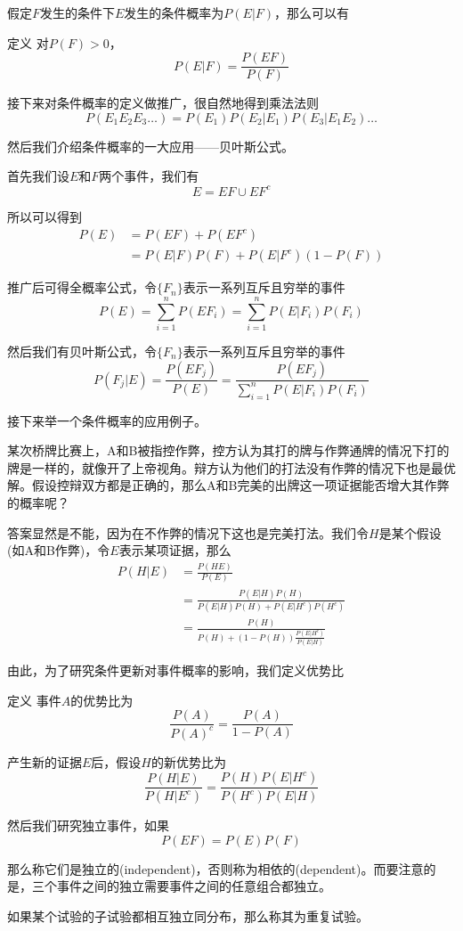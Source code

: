 \documentclass[UTF8]{ctexart}
\begin{document}
假定$F$发生的条件下$E$发生的条件概率为$P(E|F)$，那么可以有

定义 对$P(F)>0$，$$P(E|F)=\frac{P(EF)}{P(F)}$$

接下来对条件概率的定义做推广，很自然地得到乘法法则
$$P(E_{1}E_{2}E_{3}\ldots )=P(E_{1})P(E_{2}|E_{1})P(E_{3}|E_{1}E_{2})\ldots $$

然后我们介绍条件概率的一大应用——贝叶斯公式。

首先我们设$E$和$F$两个事件，我们有
$$E=EF\cup EF^{c}$$

所以可以得到
$$\begin{aligned}
P(E)&=P(EF)+P(EF^{c})\\
&=P(E|F)P(F)+P(E|F^{c})(1-P(F))
\end{aligned}$$

推广后可得全概率公式，令$\{F_{n}\}$表示一系列互斥且穷举的事件
$$P(E)=\sum_{i=1}^{n}P(EF_{i})=\sum_{i=1}^{n}P(E|F_{i})P(F_{i}) $$

然后我们有贝叶斯公式，令$\{F_{n}\}$表示一系列互斥且穷举的事件
$$P(F_{j}|E)=\frac{P(EF_{j})}{P(E)}=\frac{P(EF_{j})}{\sum\limits_{i=1}^{n}P(E|F_{i})P(F_{i})}$$

接下来举一个条件概率的应用例子。

某次桥牌比赛上，A和B被指控作弊，控方认为其打的牌与作弊通牌的情况下打的牌是一样的，就像开了上帝视角。辩方认为他们的打法没有作弊的情况下也是最优解。假设控辩双方都是正确的，那么A和B完美的出牌这一项证据能否增大其作弊的概率呢？

答案显然是不能，因为在不作弊的情况下这也是完美打法。我们令$H$是某个假设(如A和B作弊)，令$E$表示某项证据，那么
$$\begin{aligned}
P(H|E)&=\frac{P(HE)}{P(E)}\\
&=\frac{P(E|H)P(H)}{P(E|H)P(H)+P(E|H^{c})P(H^{c})}\\
&=\frac{P(H)}{P(H)+(1-P(H))\frac{P(E|H^{c})}{P(E|H)}}
\end{aligned}$$

由此，为了研究条件更新对事件概率的影响，我们定义优势比

定义 事件$A$的优势比为
$$\frac{P(A)}{P(A)^{c}}=\frac{P(A)}{1-P(A)}$$

产生新的证据$E$后，假设$H$的新优势比为
$$\frac{P(H|E)}{P(H|E^{c})}=\frac{P(H)P(E|H^{c})}{P(H^{c})P(E|H)}$$

然后我们研究独立事件，如果
$$P(EF)=P(E)P(F)$$

那么称它们是独立的(independent)，否则称为相依的(dependent)。而要注意的是，三个事件之间的独立需要事件之间的任意组合都独立。

如果某个试验的子试验都相互独立同分布，那么称其为重复试验。
\end{document}
